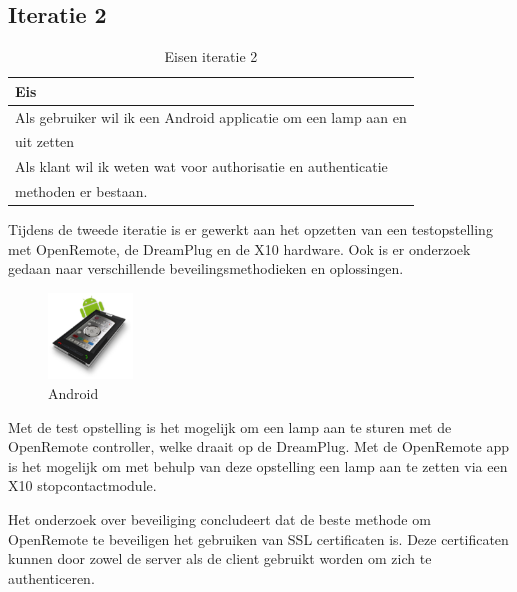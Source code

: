 \documentclass[]{article}
\begin{document}
\subsection{Iteratie 2}
\begin{table}[htpb]
  \caption{Eisen iteratie 2}
  \begin{center}
    \begin{tabular}{|| l ||}\hline
        Eis                                                              \\\hline\hline
        Als gebruiker wil ik een Android applicatie om een lamp aan en   \\ 
        uit zetten                                                       \\\hline
        Als klant wil ik weten wat voor authorisatie en authenticatie    \\
        methoden er bestaan.                                             \\\hline
    \end{tabular}
  \end{center}
\end{table}

Tijdens de tweede iteratie is er gewerkt aan het opzetten van een
testopstelling met OpenRemote, de DreamPlug en de X10 hardware. Ook is er
onderzoek gedaan naar verschillende beveilingsmethodieken en oplossingen.

\begin{figure}
  \begin{center}
    \includegraphics[width=0.20\textwidth]{android.pdf}
  \end{center}
  \caption{Android}
\end{figure}

Met de test opstelling is het mogelijk om een lamp
aan te sturen met de OpenRemote controller, welke draait op de
DreamPlug. Met de OpenRemote app is het mogelijk om met behulp van deze
opstelling een lamp aan te zetten via een X10 stopcontactmodule.

Het onderzoek over beveiliging concludeert dat de beste methode om
OpenRemote te beveiligen het gebruiken van SSL certificaten is. Deze
certificaten kunnen door zowel de server als de client gebruikt worden om
zich te authenticeren.
\end{document}
